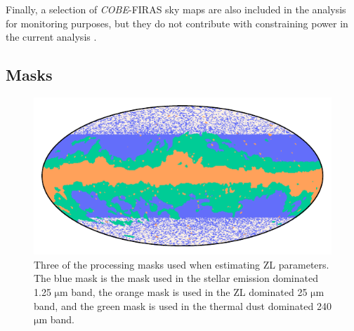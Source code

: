 \documentclass[twocolumn]{aa}
\begin{document}
Finally, a selection of \textit{COBE}-FIRAS \citep{mather:1994} sky maps are
also included in the analysis for monitoring purposes,
but they do not contribute with constraining power in the current
analysis \citep{CG02_01}.

\subsection{Masks}
\label{sec:masks}

\begin{figure}
    \centering
    \includegraphics[width=\columnwidth]{figs/zodi_proc_masks.pdf}
    \caption{Three of the processing masks used when estimating ZL parameters. The blue mask is the 
    mask used in the stellar emission dominated 1.25 $\mathrm{\mu m}$ band, the orange mask is used 
    in the ZL dominated 25 $\mathrm{\mu m}$ band, and the green mask is used in the thermal dust dominated 
    240 $\mathrm{\mu m}$ band.}
    \label{fig:zodi-procmask}
\end{figure}
\end{document}
